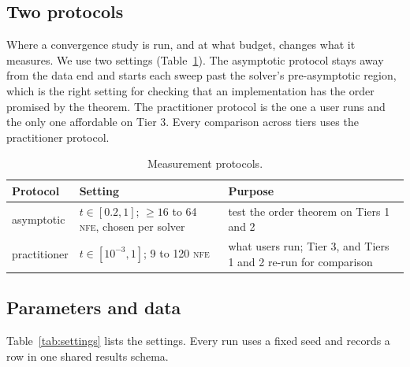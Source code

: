 \documentclass[sigconf]{acmart}
\newcommand{\NFE}{\textsc{nfe}}
\begin{document}
\subsection{Two protocols}

Where a convergence study is run, and at what budget, changes what it measures.
We use two settings (Table~\ref{tab:protocols}). The asymptotic protocol stays away
from the data end and starts each sweep past the solver's pre-asymptotic region,
which is the right setting for checking that an implementation has the order
promised by the theorem. The practitioner protocol is the one a user runs and the only
one affordable on Tier 3. Every comparison across tiers uses the practitioner
protocol.

\begin{table}[t]
\caption{Measurement protocols.}
\label{tab:protocols}
\small
\begin{tabular}{@{}p{1.55cm}p{2.85cm}p{3.35cm}@{}}
\toprule
Protocol & Setting & Purpose \\
\midrule
asymptotic & $t\in[0.2,1]$; $\ge 16$ to 64 \NFE, chosen per solver & test the order theorem on Tiers 1 and 2 \\
practitioner & $t\in[10^{-3},1]$; 9 to 120 \NFE & what users run; Tier 3, and Tiers 1 and 2 re-run for comparison \\
\bottomrule
\end{tabular}
\end{table}

\subsection{Parameters and data}

Table~\ref{tab:settings} lists the settings. Every run uses a fixed seed and
records a row in one shared results schema.
\end{document}
